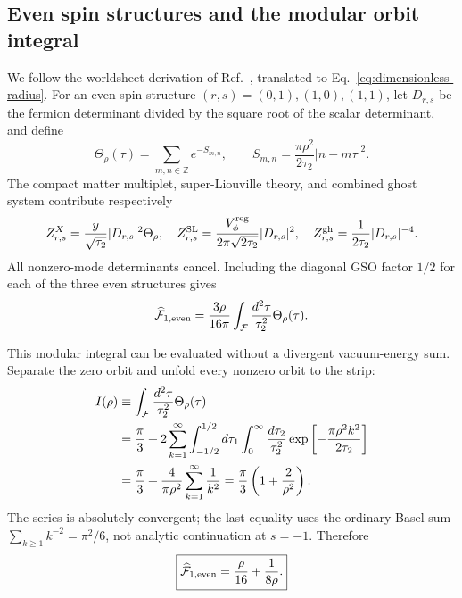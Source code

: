 \documentclass[11pt]{article}
\begin{document}
\subsection{Even spin structures and the modular orbit integral}

We follow the worldsheet derivation of
Ref.~\cite{DouglasEtAl2003NewHat}, translated to Eq.~\eqref{eq:dimensionless-radius}.
For an even spin structure $(r,s)=(0,1),(1,0),(1,1)$, let $D_{r,s}$ be the
fermion determinant divided by the square root of the scalar determinant,
and define
\begin{equation}
 \Theta_\rho(\tau)=\sum_{m,n\in\mathbb Z}e^{-S_{m,n}},
 \qquad
 S_{m,n}=\frac{\pi\rho^2}{2\tau_2}|n-m\tau|^2.
 \label{eq:bry-circle-lattice}
\end{equation}
The compact matter multiplet, super-Liouville theory, and combined ghost
system contribute respectively
\begin{equation}
 Z^X_{r,s}=\frac{y}{\sqrt{\tau_2}}|D_{r,s}|^2\Theta_\rho,
 \quad
 Z^{\rm SL}_{r,s}=\frac{V_\phi^{\rm reg}}{2\pi\sqrt{2\tau_2}}
 |D_{r,s}|^2,
 \quad
 Z^{\rm gh}_{r,s}=\frac1{2\tau_2}|D_{r,s}|^{-4}.
 \label{eq:even-spin-factors}
\end{equation}
All nonzero-mode determinants cancel.  Including the diagonal GSO factor
$1/2$ for each of the three even structures gives
\begin{equation}
 \widehat{\mathcal F}_{1,\rm even}
 =\frac{3\rho}{16\pi}
 \int_{\mathcal F}\frac{d^2\tau}{\tau_2^2}\Theta_\rho(\tau).
 \label{eq:even-spin-integral}
\end{equation}

This modular integral can be evaluated without a divergent vacuum-energy
sum.  Separate the zero orbit and unfold every nonzero orbit to the strip:
\begin{align}
 I(\rho)&\equiv
 \int_{\mathcal F}\frac{d^2\tau}{\tau_2^2}\Theta_\rho(\tau)\notag\\
 &=\frac\pi3+2\sum_{k=1}^{\infty}
 \int_{-1/2}^{1/2}d\tau_1\int_0^\infty\frac{d\tau_2}{\tau_2^2}
 \exp\left[-\frac{\pi\rho^2k^2}{2\tau_2}\right]\notag\\
 &=\frac\pi3+\frac4{\pi\rho^2}\sum_{k=1}^{\infty}\frac1{k^2}
 =\frac\pi3\left(1+\frac2{\rho^2}\right).
 \label{eq:lattice-orbit-integral}
\end{align}
The series is absolutely convergent; the last equality uses the ordinary
Basel sum $\sum_{k\ge1}k^{-2}=\pi^2/6$, not analytic continuation at
$s=-1$.  Therefore
\begin{equation}
 \boxed{
 \widehat{\mathcal F}_{1,\rm even}
 =\frac\rho{16}+\frac1{8\rho}.}
 \label{eq:even-spin-density}
\end{equation}
\end{document}
